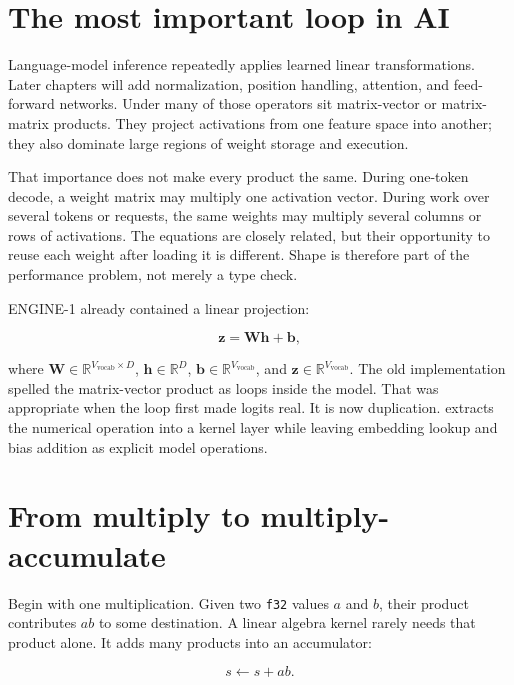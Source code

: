 \section{The most important loop in
AI}\label{the-most-important-loop-in-ai}

Language-model inference repeatedly applies learned linear
transformations. Later chapters will add normalization, position
handling, attention, and feed-forward networks. Under many of those
operators sit matrix-vector or matrix-matrix products. They project
activations from one feature space into another; they also dominate
large regions of weight storage and execution.

That importance does not make every product the same. During one-token
decode, a weight matrix may multiply one activation vector. During work
over several tokens or requests, the same weights may multiply several
columns or rows of activations. The equations are closely related, but
their opportunity to reuse each weight after loading it is different.
Shape is therefore part of the performance problem, not merely a type
check.

ENGINE-1 already contained a linear projection:

\begin{equation}
\mathbf{z}=\mathbf{W}\mathbf{h}+\mathbf{b},
\end{equation}

where \(\mathbf{W}\in\mathbb{R}^{V_{\mathrm{vocab}}\times D}\),
\(\mathbf{h}\in\mathbb{R}^{D}\),
\(\mathbf{b}\in\mathbb{R}^{V_{\mathrm{vocab}}}\), and
\(\mathbf{z}\in\mathbb{R}^{V_{\mathrm{vocab}}}\). The old implementation
spelled the matrix-vector product as loops inside the model. That was
appropriate when the loop first made logits real. It is now duplication.
 extracts the numerical operation into a kernel layer while
leaving embedding lookup and bias addition as explicit model operations.

\section{From multiply to
multiply-accumulate}\label{from-multiply-to-multiply-accumulate}

Begin with one multiplication. Given two \texttt{f32} values \(a\) and
\(b\), their product contributes \(ab\) to some destination. A linear
algebra kernel rarely needs that product alone. It adds many products
into an accumulator:

\begin{equation}
s \leftarrow s + ab.
\end{equation}

